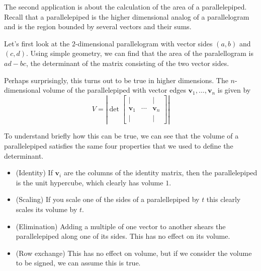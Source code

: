 \documentclass[11pt,oneside]{amsbook}
\theoremstyle{definition}
\theoremstyle{plain}
\theoremstyle{definition}
\theoremstyle{remark}
\numberwithin{equation}{section}
\numberwithin{figure}{section}
\begin{document}
The second application is about the calculation of the area of a parallelepiped. Recall that a parallelepiped is the higher dimensional analog of a parallelogram and is the region bounded by several vectors and their sums.

Let's first look at the $2$-dimensional parallelogram with vector sides $(a,b)$ and $(c,d)$. Using simple geometry, we can find that the area of the paralellogram is $ad-bc$, the determinant of the matrix consisting of the two vector sides.
\begin{center}
\end{center}

Perhaps surprisingly, this turns out to be true in higher dimensions. The $n$-dimensional volume of the parallelepiped with vector edges $\bm{v}_1,\ldots,\bm{v}_n$ is given by
\[V=\left|\det\begin{bmatrix}
      |&&|\\
      \bm{v}_1&\cdots&\bm{v}_n\\
      |&&|
    \end{bmatrix}\right|
\]

To understand briefly how this can be true, we can see that the volume of a parallelepiped satisfies the same four properties that we used to define the determinant.
\begin{itemize}
  \item (Identity) If $\bm{v}_i$ are the columns of the identity matrix, then the parallelepiped is the unit hypercube, which clearly has volume $1$.
  \item (Scaling) If you scale one of the sides of a paralellepiped by $t$ this clearly scales its volume by $t$.
  \item (Elimination) Adding a multiple of one vector to another shears the parallelepiped along one of its sides. This has no effect on its volume.
  \item (Row exchange) This has no effect on volume, but if we consider the volume to be signed, we can assume this is true.
\end{itemize}
\end{document}

